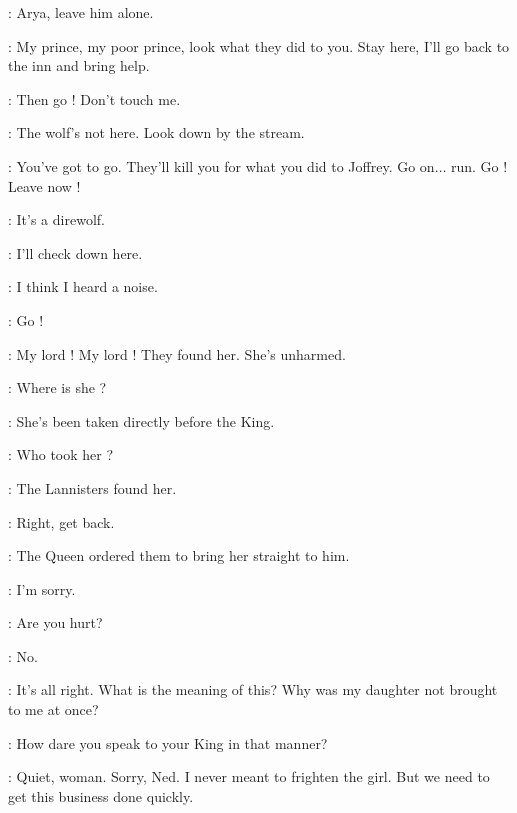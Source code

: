 \SANSA: Arya, leave him alone.  


\SANSA: My prince, my poor prince, look what they did to you. Stay here, I'll go back to the inn and bring help. 

\JOFFREY: Then go ! Don't touch me. 

\scene


\SOLDIERa: The wolf's not here. Look down by the stream. 

\ARYA: You've got to go. They'll kill you for what you did to Joffrey. Go on$\ldots$ run. Go ! Leave now ! 

\SOLDIERb: It's a direwolf. 

\SOLDIERa: I'll check down here. 

\SOLDIERb: I think I heard a noise. 

\ARYA: Go ! 

\scene


\JORY: My lord ! My lord ! They found her. She's unharmed. 

\NED: Where is she ? 

\JORY: She's been taken directly before the King. 

\NED: Who took her ? 

\JORY: The Lannisters found her. 

\NED: Right, get back. 

\JORY: The Queen ordered them to bring her straight to him. 

\scene


\ARYA: I'm sorry. 

\NED: Are you hurt? 

\ARYA: No. 

\NED: It's all right. What is the meaning of this? Why was my daughter not brought to me at once? 

\CERSEI: How dare you speak to your King in that manner? 

\ROBERT: Quiet, woman. Sorry, Ned. I never meant to frighten the girl. But we need to get this business done quickly. 

